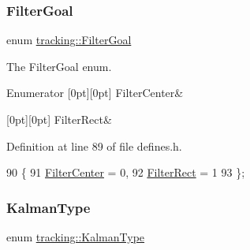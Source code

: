 \subsubsection{\texorpdfstring{Filter\+Goal}{FilterGoal}}
{\footnotesize\ttfamily enum \mbox{\hyperlink{namespacetracking_a9b3e7d16c86cd8b781ab214e396b0ebf}{tracking\+::\+Filter\+Goal}}}



The Filter\+Goal enum. 

\begin{DoxyEnumFields}{Enumerator}
[0pt][0pt]{}\mbox{\label{namespacetracking_a9b3e7d16c86cd8b781ab214e396b0ebfafac394783c1196957768400bc53ba491}} 
Filter\+Center&\\
\hline

[0pt][0pt]{}\mbox{\label{namespacetracking_a9b3e7d16c86cd8b781ab214e396b0ebfabb259eae9513c55b313c553ce6249aea}} 
Filter\+Rect&\\
\hline

\end{DoxyEnumFields}


Definition at line 89 of file defines.\+h.


\begin{DoxyCode}
90 \{
91     \mbox{\hyperlink{namespacetracking_a9b3e7d16c86cd8b781ab214e396b0ebfafac394783c1196957768400bc53ba491}{FilterCenter}} = 0,
92     \mbox{\hyperlink{namespacetracking_a9b3e7d16c86cd8b781ab214e396b0ebfabb259eae9513c55b313c553ce6249aea}{FilterRect}} = 1
93 \};
\end{DoxyCode}
\mbox{\label{namespacetracking_a83f2c4d58ea2737f7d6296dce3eb722a}} 
\subsubsection{\texorpdfstring{Kalman\+Type}{KalmanType}}
{\footnotesize\ttfamily enum \mbox{\hyperlink{namespacetracking_a83f2c4d58ea2737f7d6296dce3eb722a}{tracking\+::\+Kalman\+Type}}}



